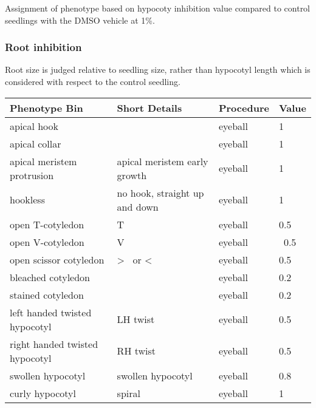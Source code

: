 Assignment of phenotype based on hypocoty inhibition value compared to control seedlings with the DMSO vehicle at 1{\%}.

\subsubsection{Root inhibition}

Root size is judged relative to seedling size, rather than hypocotyl length which is considered with respect to the control seedling.

\begin{table}\centering
    \begin{tabular}{|l|l|l|l|}
    \hline
    Phenotype Bin                  & Short Details                    & Procedure & Value \\ \hline
    apical hook                    & ~                                & eyeball   & 1      \\ \hline
    apical collar                  & ~                                & eyeball   & 1      \\ \hline
    apical meristem protrusion     & apical meristem early growth     & eyeball   & 1      \\ \hline
    hookless                       & no hook, straight up and down    & eyeball   & 1      \\ \hline
    open T-cotyledon               & T                                & eyeball   & 0.5    \\ \hline
    open V-cotyledon               & V                                & eyeball   &  0.5   \\ \hline
    open scissor cotyledon         & \textgreater ~ or \textless           & eyeball   & 0.5    \\ \hline
    bleached cotyledon             & ~                                & eyeball   & 0.2    \\ \hline
    stained cotyledon              & ~                                & eyeball   & 0.2    \\ \hline
    left handed twisted hypocotyl  & LH twist                         & eyeball   & 0.5    \\ \hline
    right handed twisted hypocotyl & RH twist                         & eyeball   & 0.5    \\ \hline
    swollen hypocotyl              & swollen hypocotyl                & eyeball   & 0.8    \\ \hline
    curly hypocotyl                & spiral                           & eyeball   & 1      \\ \hline

\end{tabular}
\end{table}
